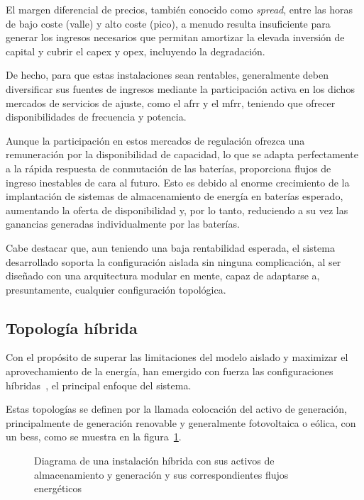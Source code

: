 El margen diferencial de precios, también conocido como \textit{spread}, entre las horas de bajo coste (valle) y alto coste (pico), a menudo resulta insuficiente para generar los ingresos necesarios que permitan amortizar la elevada inversión de capital y cubrir el \gls{capex} y \gls{opex}, incluyendo la degradación.

De hecho, para que estas instalaciones sean rentables, generalmente deben diversificar sus fuentes de ingresos mediante la participación activa en los dichos mercados de servicios de ajuste, como el \gls{afrr} y el \gls{mfrr}, teniendo que ofrecer disponibilidades de frecuencia y potencia.

Aunque la participación en estos mercados de regulación ofrezca una remuneración por la disponibilidad de capacidad, lo que se adapta perfectamente a la rápida respuesta de conmutación de las baterías, proporciona flujos de ingreso inestables de cara al futuro. Esto es debido al enorme crecimiento de la implantación de sistemas de almacenamiento de energía en baterías esperado, aumentando la oferta de disponibilidad y, por lo tanto, reduciendo a su vez las ganancias generadas individualmente por las baterías.

Cabe destacar que, aun teniendo una baja rentabilidad esperada, el sistema desarrollado soporta la configuración aislada sin ninguna complicación, al ser diseñado con una arquitectura modular en mente, capaz de adaptarse a, presuntamente, cualquier configuración topológica.

\subsection{Topología híbrida}
\label{makereference3.1.2}

Con el propósito de superar las limitaciones del modelo aislado y maximizar el aprovechamiento de la energía, han emergido con fuerza las configuraciones híbridas~\cite{bresciani2025hybridization}, el principal enfoque del sistema.

Estas topologías se definen por la llamada colocación del activo de generación, principalmente de generación renovable y generalmente fotovoltaica o eólica, con un \gls{bess}, como se muestra en la figura~\ref{fig:topologia-hibrida}.

\begin{figure}
  \centering
  \caption{Diagrama de una instalación híbrida con sus activos de almacenamiento y generación y sus correspondientes flujos energéticos}
  \label{fig:topologia-hibrida}
\end{figure}

